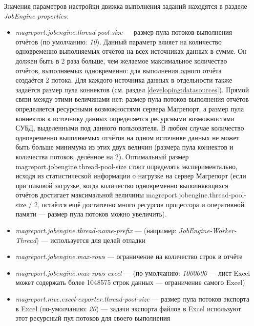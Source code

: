 \documentclass[../user-manual.tex]{subfiles}
\begin{document}
	Значения параметров настройки движка выполнения заданий находятся в разделе \textit{JobEngine properties}:
	
	\begin{itemize}
		\item \textit{magreport.jobengine.thread-pool-size} --- размер пула потоков выполнения отчётов (по умолчанию: \textit{10}). Данный параметр влияет на количество одновременно выполняемых отчётов на всех источниках данных в сумме. Он должен быть в 2 раза больше, чем желаемое максимальное количество отчётов, выполняемых одновременно: для выполнения одного отчёта создаётся 2 потока. Для каждого источника данных в отдельности также задаётся размер пула коннектов (см. раздел \ref{developing:datasources}). Прямой связи между этими величинами нет: размер пула потоков выполнения отчётов определяется ресурсными возможностями сервера Магрепорт, а размер пула коннектов к источнику данных определяется ресурсными возможностями СУБД, выделенными под данного пользователя. В любом случае количество одновременно выполняемых отчётов на одном источнике данных не может быть больше минимума из этих двух величин (размера пула коннектов и количества потоков, делённое на 2). Оптимальный размер magreport.jobengine.thread-pool-size стоит определять экспериментально, исходя из статистической информации о нагрузке на сервер Магрепорт (если при пиковой загрузке, когда количество одновременно выполняющихся отчётов достигает максимальной величины magreport.jobengine.thread-pool-size / 2, остаётся ещё достаточно много ресурсов процессора и оперативной памяти --- размер пула потоков можно увеличить).
		
		\item \textit{magreport.jobengine.thread-name-prefix} --- (например: \textit{JobEngine-Worker-Thread}) --- используется для целей отладки
		
		\item \textit{magreport.jobengine.max-rows} --- ограничение на количество строк в отчёте 
		
		\item \textit{magreport.jobengine.max-rows-excel} --- (по умолчанию: \textit{1000000} --- лист Excel может содержать более 1048575 строк данных --- ограничение самого Excel)
		
		\item \textit{magreport.mvc.excel-exporter.thread-pool-size} --- размер пула потоков экспорта в Excel (по-умолчанию: \textit{20}) --- задачи экспорта файлов в Excel используют этот ресурсный пул потоков для своего выполнения
	\end{itemize}
\end{document}
